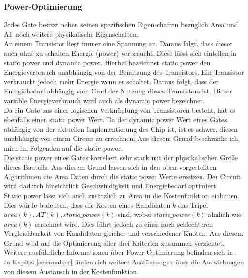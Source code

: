 \documentclass[11pt, a4paper, german]{article}
\begin{document}
\subsubsection{Power-Optimierung}
Jedes Gate besitzt neben seinen spezifischen Eigenschaften bezüglich Area und AT noch weitere physikalische Eigenschaften.\\
An einem Transistor liegt immer eine Spannung an. Daraus folgt, dass dieser auch ohne zu schalten Energie (power) verbraucht. Diese lässt sich einteilen in static power und dynamic power. Hierbei bezeichnet static power den Energieverbrauch unabhängig von der Benutzung des Transistors. Ein Transistor verbraucht jedoch mehr Energie wenn er schaltet. Daraus folgt, dass der Energiebedarf abhängig vom Grad der Nutzung dieses Transistors ist. Dieser variable Energieverbrauch wird auch als dynamic power bezeichnet.\\
Da ein Gate aus einer logischen Verknüpfung von Transistoren besteht, hat es ebenfalls einen static power Wert. Da der dynamic power Wert eines Gates abhängig von der aktuellen Implementierung des Chip ist, ist es schwer, diesen unabhängig von einem Circuit zu errechnen. Aus diesem Grund beschränke ich mich im Folgenden auf die static power. \\
Die static power eines Gates korreliert sehr stark mit der physikalischen Größe dieses Bauteils. Aus diesem Grund lassen sich in den oben vorgestellten Algorithmen die Area Daten durch die static power Werte ersetzen. Der Circuit wird dadurch hinsichtlich Geschwindigkeit und Energiebedarf optimiert. \\
Static power lässt sich auch zusätzlich zu Area in die Kostenfunktion einbauen. Dies würde bedeuten, dass die Kosten eines Kandidaten $k$ das Tripel $area(k), AT(k), static\_power(k)$ sind, wobei $static\_power(k)$ ähnlich wie $area(k)$ errechnet wird. Dies führt jedoch zu einer noch schlechteren Vergleichbarkeit von Kandidaten gleicher und verschiedener Knoten. Aus diesem Grund wird auf die Optimierung aller drei Kriterien zusammen verzichtet. \\
Weitere ausführliche Informationen über Power-Optimierung befinden sich in \cite{Daboul}.\\
In Kapitel \ref{sec:analyse} finden sich weitere Ausführungen über die Auswirkungen von diesem Austausch in der Kostenfunktion.
	
\end{document}
